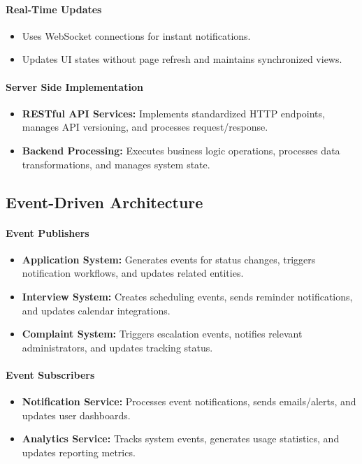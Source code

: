 \paragraph{Real-Time Updates}
\begin{itemize}
    \item Uses WebSocket connections for instant notifications.
    \item Updates UI states without page refresh and maintains synchronized views.
\end{itemize}

\paragraph{Server Side Implementation}
\begin{itemize}
    \item \textbf{RESTful API Services:} Implements standardized HTTP endpoints, manages API versioning, and processes request/response.
    \item \textbf{Backend Processing:} Executes business logic operations, processes data transformations, and manages system state.
\end{itemize}

\subsection{Event-Driven Architecture}
\paragraph{Event Publishers}
\begin{itemize}
    \item \textbf{Application System:} Generates events for status changes, triggers notification workflows, and updates related entities.
    \item \textbf{Interview System:} Creates scheduling events, sends reminder notifications, and updates calendar integrations.
    \item \textbf{Complaint System:} Triggers escalation events, notifies relevant administrators, and updates tracking status.
\end{itemize}

\paragraph{Event Subscribers}
\begin{itemize}
    \item \textbf{Notification Service:} Processes event notifications, sends emails/alerts, and updates user dashboards.
    \item \textbf{Analytics Service:} Tracks system events, generates usage statistics, and updates reporting metrics.
\end{itemize}

